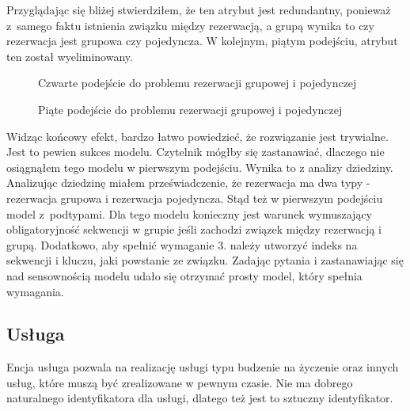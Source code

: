 \documentclass[a4paper,onecolumn,oneside,11pt,wide,floatssmall]{mwrep}
\theoremstyle{definition}
\theoremstyle{plain}%
\theoremstyle{remark}
\begin{document}
Przyglądając się bliżej stwierdziłem, że ten atrybut jest redundantny, ponieważ \mbox{z samego} faktu istnienia związku między rezerwacją, a grupą wynika to czy rezerwacja jest grupowa czy pojedyncza. W kolejnym, piątym podejściu, atrybut ten został wyeliminowany.

\begin{figure}[H]
  \begin{center}
  \end{center}
  \caption{Czwarte podejście do problemu rezerwacji grupowej i pojedynczej}
  \label{fig:db-logical-model-group-reservation-fourth-try}
\end{figure}

\begin{figure}[H]
  \begin{center}
  \end{center}
  \caption{Piąte podejście do problemu rezerwacji grupowej i pojedynczej}
  \label{fig:db-logical-model-group-reservation-fifth-try}
\end{figure}

Widząc końcowy efekt, bardzo łatwo powiedzieć, że rozwiązanie jest trywialne. Jest to pewien sukces modelu. Czytelnik mógłby się zastanawiać, dlaczego nie osiągnąłem tego modelu w pierwszym podejściu. Wynika to z analizy dziedziny. Analizując dziedzinę miałem przeświadczenie, że rezerwacja ma dwa typy - rezerwacja grupowa i rezerwacja pojedyncza. Stąd też w pierwszym podejściu model \mbox{z podtypami}. Dla tego modelu konieczny jest warunek wymuszający obligatoryjność sekwencji w grupie jeśli zachodzi związek między rezerwacją i grupą. Dodatkowo, aby spełnić wymaganie 3. należy utworzyć indeks na sekwencji i kluczu, jaki powstanie ze związku. Zadając pytania i zastanawiając się nad sensownością modelu udało się otrzymać prosty model, który spełnia wymagania.

\subsection{Usługa}
Encja usługa pozwala na realizację usługi typu budzenie na życzenie oraz innych usług, które muszą być zrealizowane w pewnym czasie. Nie ma dobrego naturalnego identyfikatora dla usługi, dlatego też jest to sztuczny identyfikator.
\end{document}
